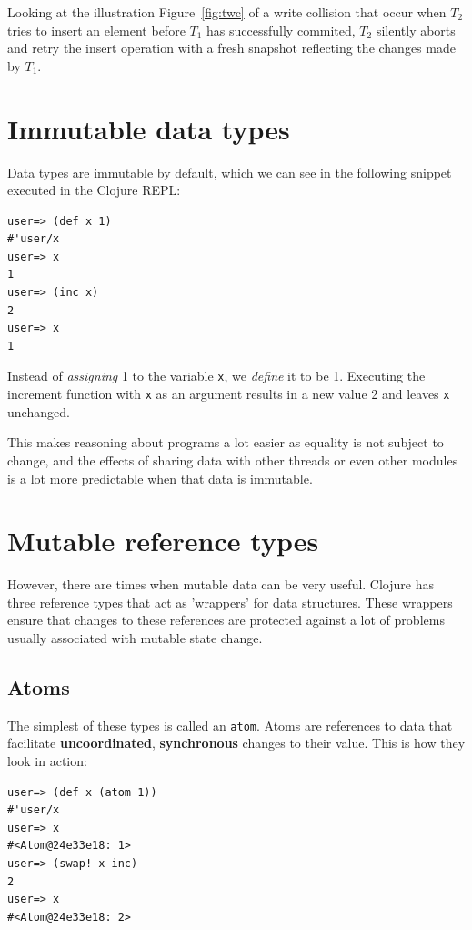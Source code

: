 \documentclass[a4paper,12pt]{kth-mag}
\begin{document}
Looking at the illustration Figure~\ref{fig:twc} of a write collision that occur when $T_2$ tries to insert an element before $T_1$ has successfully commited, $T_2$ silently aborts and retry the insert operation with a fresh snapshot reflecting the changes made by $T_1$.

\section{Immutable data types}

Data types are immutable by default, which we can see in the following snippet executed in the Clojure REPL:

\begin{listing}[H]
	\begin{verbatim}
user=> (def x 1)
#'user/x
user=> x
1
user=> (inc x)
2
user=> x
1
	\end{verbatim}
\end{listing}

Instead of \textit{assigning} 1 to the variable \texttt{x}, we \textit{define} it to be 1. Executing the increment function with \texttt{x} as an argument results in a new value 2 and leaves \texttt{x} unchanged.

This makes reasoning about programs a lot easier as equality is not subject to change, and the effects of sharing data with other threads or even other modules is a lot more predictable when that data is immutable.

\section{Mutable reference types}

However, there are times when mutable data can be very useful. Clojure has three reference types that act as 'wrappers' for data structures. These wrappers ensure that changes to these references are protected against a lot of problems usually associated with mutable state change.

\subsection{Atoms}

The simplest of these types is called an \texttt{atom}. Atoms are references to data that facilitate \textbf{uncoordinated}, \textbf{synchronous} changes to their value. This is how they look in action:

\begin{listing}[H]
	\begin{verbatim}
user=> (def x (atom 1))
#'user/x
user=> x
#<Atom@24e33e18: 1>
user=> (swap! x inc)
2
user=> x
#<Atom@24e33e18: 2>
	\end{verbatim}
\end{listing}
\end{document}
